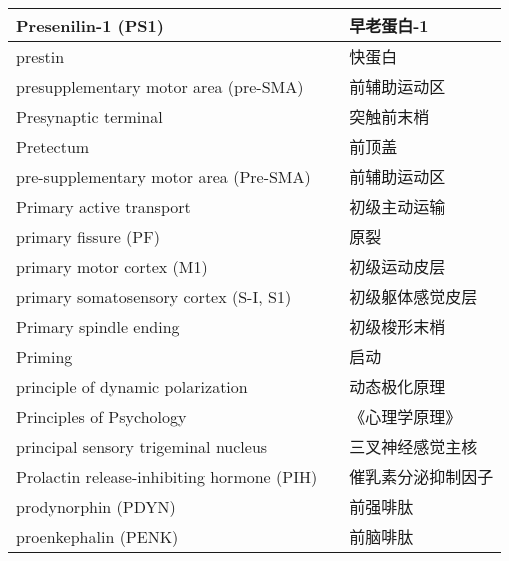 \begin{longtable}{lll}
	\midrule
	Presenilin-1 (PS1)     && 	早老蛋白-1   \\
	
	\midrule
	prestin     && 	快蛋白   \\
	
	\midrule
	presupplementary motor area (pre-SMA)    && 	前辅助运动区   \\
	
	\midrule
	Presynaptic terminal     && 	突触前末梢   \\
	
	\midrule
	Pretectum     && 	前顶盖   \\
	
	\midrule
	pre-supplementary motor area (Pre-SMA)     && 	前辅助运动区   \\
	
	\midrule
	Primary active transport   && 初级主动运输  \\
	
	\midrule
	primary fissure (PF)   && 原裂  \\
	
	\midrule
	primary motor cortex (M1)   && 初级运动皮层  \\
	
	\midrule
	primary somatosensory cortex (S-I, S1)   && 初级躯体感觉皮层  \\
	
	\midrule
	Primary spindle ending   && 初级梭形末梢  \\
	
	\midrule
	Priming   && 启动  \\
	
	\midrule
	principle of dynamic polarization   && 动态极化原理  \\
	
	\midrule
	Principles of Psychology   && 《心理学原理》  \\
	
	\midrule
	principal sensory trigeminal nucleus   && 三叉神经感觉主核  \\
	
	\midrule
	Prolactin release-inhibiting hormone (PIH)  && 催乳素分泌抑制因子  \\
	
	\midrule
	prodynorphin (PDYN)  && 前强啡肽  \\
	
	\midrule
	proenkephalin (PENK)  && 前脑啡肽  \\
	

\end{longtable}
